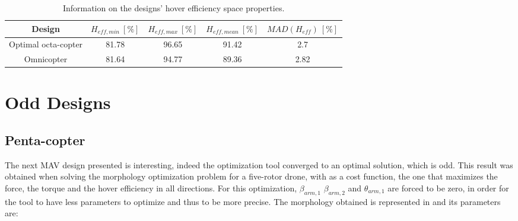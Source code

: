 \begin{table}[!ht]
\begin{center}
 \caption{Information on the designs’ torque space properties.}\vspace{1ex}
 \label{tab:tab_Octa_compare_torque}
\end{center}
\end{table}

\begin{table}[!ht]
\begin{center}
 \caption{Information on the designs’ hover efficiency space properties.}\vspace{1ex}
 \label{tab:tab_Octa_compare_hover}
 {\scriptsize\begin{tabular}{|c|cccc|}
 \hline
  Design & $H_{eff,min}\ [\%]$ & $H_{eff,max}\ [\%]$ & $H_{eff,mean}\ [\%]$
  & $MAD(H_{eff})\ [\%]$\\ \hline
  Optimal octa-copter & 81.78 & 96.65 & 91.42 & 2.7\\
  Omnicopter & 81.64 & 94.77 & 89.36 & 2.82\\
 \hline
\end{tabular}}
\end{center}
\end{table}

\section{Odd Designs}
\label{sec:odd_designs}

\subsection{Penta-copter}
\label{sec:penta_copter}

The next MAV design presented is interesting, indeed the optimization tool
converged to an optimal solution, which is odd. This result was obtained
when solving the morphology optimization problem for a five-rotor drone,
with as a cost function, the one that maximizes the force, the torque and the
hover efficiency in all directions. For this optimization, $\beta_{arm,1}$
$\beta_{arm,2}$ and $\theta_{arm,1}$ are forced to be zero,
in order for the tool to have less parameters to optimize and thus to be more
precise. The morphology obtained is represented in 
and its parameters are:

